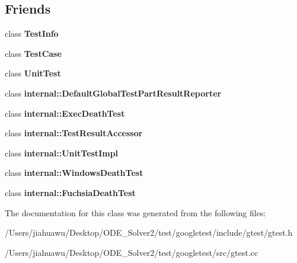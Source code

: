 \subsection*{Friends}
\begin{DoxyCompactItemize}
\item 
\mbox{\label{classtesting_1_1_test_result_a4c49c2cdb6c328e6b709b4542f23de3c}} 
class {\bfseries Test\+Info}
\item 
\mbox{\label{classtesting_1_1_test_result_aff779e55b06adfa7c0088bd10253f0f0}} 
class {\bfseries Test\+Case}
\item 
\mbox{\label{classtesting_1_1_test_result_a832b4d233efee1a32feb0f4190b30d39}} 
class {\bfseries Unit\+Test}
\item 
\mbox{\label{classtesting_1_1_test_result_abae39633da9932847b41cb80efd62115}} 
class {\bfseries internal\+::\+Default\+Global\+Test\+Part\+Result\+Reporter}
\item 
\mbox{\label{classtesting_1_1_test_result_adf5553cae6aea6f8648d47e299237e34}} 
class {\bfseries internal\+::\+Exec\+Death\+Test}
\item 
\mbox{\label{classtesting_1_1_test_result_ae762da04e74a0d3b0daded3c5bd4a8e8}} 
class {\bfseries internal\+::\+Test\+Result\+Accessor}
\item 
\mbox{\label{classtesting_1_1_test_result_acc0a5e7573fd6ae7ad1878613bb86853}} 
class {\bfseries internal\+::\+Unit\+Test\+Impl}
\item 
\mbox{\label{classtesting_1_1_test_result_a6aeedc04a0590fcc1b3c5f687dbb0f9f}} 
class {\bfseries internal\+::\+Windows\+Death\+Test}
\item 
\mbox{\label{classtesting_1_1_test_result_af29d5921f68031cdfba0b28cf4b3b559}} 
class {\bfseries internal\+::\+Fuchsia\+Death\+Test}
\end{DoxyCompactItemize}


The documentation for this class was generated from the following files\+:\begin{DoxyCompactItemize}
\item 
/\+Users/jiahuawu/\+Desktop/\+O\+D\+E\+\_\+\+Solver2/test/googletest/include/gtest/gtest.\+h\item 
/\+Users/jiahuawu/\+Desktop/\+O\+D\+E\+\_\+\+Solver2/test/googletest/src/gtest.\+cc\end{DoxyCompactItemize}
